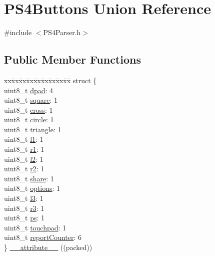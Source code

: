\hypertarget{union_p_s4_buttons}{\section{\-P\-S4\-Buttons \-Union \-Reference}
\label{union_p_s4_buttons}
}


{\ttfamily \#include $<$\-P\-S4\-Parser.\-h$>$}

\subsection*{\-Public \-Member \-Functions}
\begin{DoxyCompactItemize}
\item 
\begin{tabbing}
xx\=xx\=xx\=xx\=xx\=xx\=xx\=xx\=xx\=\kill
struct \{\\
\>uint8\_t \hyperlink{union_p_s4_buttons_a99e2971b4e511a8d1bb718408f559a92}{dpad}: 4\\
\>uint8\_t \hyperlink{union_p_s4_buttons_a84eb7076098ec3135bdc440a279fde50}{square}: 1\\
\>uint8\_t \hyperlink{union_p_s4_buttons_a1163dc3517b1c27093b7cdd597eaa9fd}{cross}: 1\\
\>uint8\_t \hyperlink{union_p_s4_buttons_a95340b24c0846c778d2d8d0c983f4cdb}{circle}: 1\\
\>uint8\_t \hyperlink{union_p_s4_buttons_a72d07e9a47b1b75474e152b6aaeae6e5}{triangle}: 1\\
\>uint8\_t \hyperlink{union_p_s4_buttons_a3488f850c1de8d49a9dc932f1575e5e4}{l1}: 1\\
\>uint8\_t \hyperlink{union_p_s4_buttons_aba0cb76ee82bd0ebe9872aa7bcbffac6}{r1}: 1\\
\>uint8\_t \hyperlink{union_p_s4_buttons_a99b88dcb511243ea0c046cac1f5633ec}{l2}: 1\\
\>uint8\_t \hyperlink{union_p_s4_buttons_a416642ff357b1313825fe94e0491b60e}{r2}: 1\\
\>uint8\_t \hyperlink{union_p_s4_buttons_adf2ff3e6e4050070a68e90a83be81e92}{share}: 1\\
\>uint8\_t \hyperlink{union_p_s4_buttons_a27f1b87f473ace3a4465ae999858357b}{options}: 1\\
\>uint8\_t \hyperlink{union_p_s4_buttons_ab8835f04d0c0c5e630d685ec2fd54e80}{l3}: 1\\
\>uint8\_t \hyperlink{union_p_s4_buttons_a09805f3bcc362c410d7897792599d61d}{r3}: 1\\
\>uint8\_t \hyperlink{union_p_s4_buttons_a5fdf37790214db1379457bab99adace9}{ps}: 1\\
\>uint8\_t \hyperlink{union_p_s4_buttons_a785305478e29a078003c360babb50ab0}{touchpad}: 1\\
\>uint8\_t \hyperlink{union_p_s4_buttons_a5c27c151ad76a3675dce1eda1a3e4cc4}{reportCounter}: 6\\
\} \hyperlink{union_p_s4_buttons_a3301db503dba762aa1e5395ed99278f7}{\_\_attribute\_\_} ((packed))\\

\end{tabbing}\end{DoxyCompactItemize}
